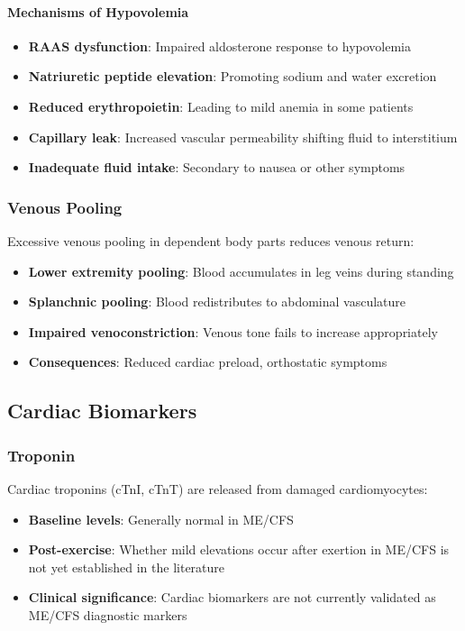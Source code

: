 \paragraph{Mechanisms of Hypovolemia}
\begin{itemize}
    \item \textbf{RAAS dysfunction}: Impaired aldosterone response to hypovolemia
    \item \textbf{Natriuretic peptide elevation}: Promoting sodium and water excretion
    \item \textbf{Reduced erythropoietin}: Leading to mild anemia in some patients
    \item \textbf{Capillary leak}: Increased vascular permeability shifting fluid to interstitium
    \item \textbf{Inadequate fluid intake}: Secondary to nausea or other symptoms
\end{itemize}

\subsubsection{Venous Pooling}

Excessive venous pooling in dependent body parts reduces venous return:

\begin{itemize}
    \item \textbf{Lower extremity pooling}: Blood accumulates in leg veins during standing
    \item \textbf{Splanchnic pooling}: Blood redistributes to abdominal vasculature
    \item \textbf{Impaired venoconstriction}: Venous tone fails to increase appropriately
    \item \textbf{Consequences}: Reduced cardiac preload, orthostatic symptoms
\end{itemize}

\subsection{Cardiac Biomarkers}
\label{sec:cardiac-biomarkers}

\subsubsection{Troponin}

Cardiac troponins (cTnI, cTnT) are released from damaged cardiomyocytes:

\begin{itemize}
    \item \textbf{Baseline levels}: Generally normal in ME/CFS
    \item \textbf{Post-exercise}: Whether mild elevations occur after exertion in ME/CFS is not yet established in the literature
    \item \textbf{Clinical significance}: Cardiac biomarkers are not currently validated as ME/CFS diagnostic markers
\end{itemize}

